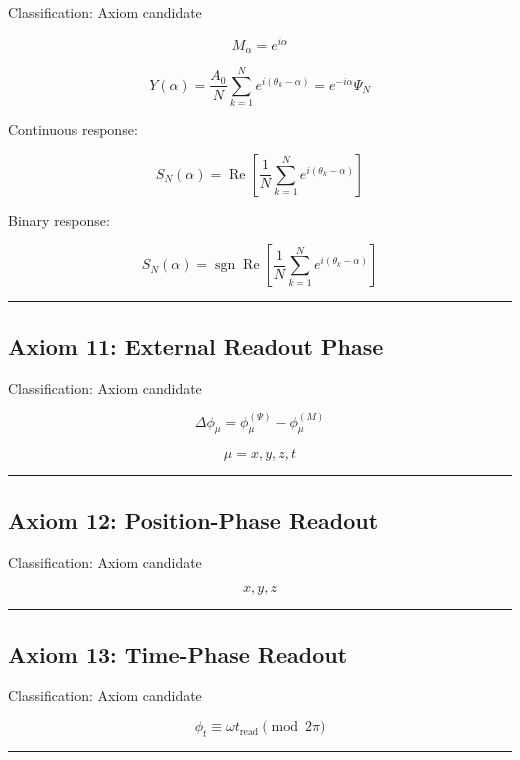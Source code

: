 \documentclass[
  a4paper,
]{article}
\begin{document}
Classification: Axiom candidate

\[
M_\alpha=e^{i\alpha}
\]

\[
Y(\alpha)=\frac{A_0}{N}\sum_{k=1}^{N}e^{i(\theta_k-\alpha)}
=e^{-i\alpha}\Psi_N
\]

Continuous response:

\[
S_N(\alpha)=\operatorname{Re}\left[\frac{1}{N}\sum_{k=1}^{N}e^{i(\theta_k-\alpha)}\right]
\]

Binary response:

\[
S_N(\alpha)=\operatorname{sgn}\operatorname{Re}\left[\frac{1}{N}\sum_{k=1}^{N}e^{i(\theta_k-\alpha)}\right]
\]

\begin{center}\rule{0.5\linewidth}{0.5pt}\end{center}

\subsection{Axiom 11: External Readout
Phase}\label{axiom-11-external-readout-phase}

Classification: Axiom candidate

\[
\Delta\phi_\mu=\phi_\mu^{(\Psi)}-\phi_\mu^{(M)}
\]

\[
\mu=x,y,z,t
\]

\begin{center}\rule{0.5\linewidth}{0.5pt}\end{center}

\subsection{Axiom 12: Position-Phase
Readout}\label{axiom-12-position-phase-readout}

Classification: Axiom candidate

\[
x,y,z
\]

\begin{center}\rule{0.5\linewidth}{0.5pt}\end{center}

\subsection{Axiom 13: Time-Phase
Readout}\label{axiom-13-time-phase-readout}

Classification: Axiom candidate

\[
\phi_t\equiv\omega t_{\mathrm{read}}\pmod{2\pi}
\]

\begin{center}\rule{0.5\linewidth}{0.5pt}\end{center}
\end{document}
